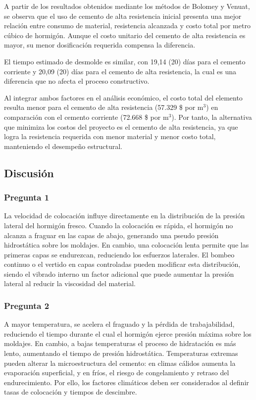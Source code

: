 A partir de los resultados obtenidos mediante los métodos de Bolomey y Venuat, se observa que el uso de cemento de alta resistencia inicial presenta una mejor relación entre consumo de material, resistencia alcanzada y costo total por metro cúbico de hormigón.  
Aunque el costo unitario del cemento de alta resistencia es mayor, su menor dosificación requerida compensa la diferencia.  

El tiempo estimado de desmolde es similar, con 19,14 (20) días para el cemento corriente y 20,09 (20) días para el cemento de alta resistencia, la cual es una diferencia que no afecta el proceso constructivo.  

Al integrar ambos factores en el análisis económico, el costo total del elemento resulta menor para el cemento de alta resistencia (57.329 \$ por m$^3$) en comparación con el cemento corriente (72.668 \$ por m$^3$).  
Por tanto, la alternativa que minimiza los costos del proyecto es el cemento de alta resistencia, ya que logra la resistencia requerida con menor material y menor costo total, manteniendo el desempeño estructural.

\subsection*{Discusión}

\subsubsection*{Pregunta 1} 
La velocidad de colocación influye directamente en la distribución de la presión lateral del hormigón fresco. Cuando la colocación es rápida, el hormigón no alcanza a fraguar en las capas de abajo, generando una pseudo presión hidrostática sobre los moldajes. En cambio, una colocación lenta permite que las primeras capas se endurezcan, reduciendo los esfuerzos laterales. El bombeo continuo o el vertido en capas controladas pueden modificar esta distribución, siendo el vibrado interno un factor adicional que puede aumentar la presión lateral al reducir la viscosidad del material.

\subsubsection*{Pregunta 2} 
A mayor temperatura, se acelera el fraguado y la pérdida de trabajabilidad, reduciendo el tiempo durante el cual el hormigón ejerce presión máxima sobre los moldajes. En cambio, a bajas temperaturas el proceso de hidratación es más lento, aumentando el tiempo de presión hidrostática. Temperaturas extremas pueden alterar la microestructura del cemento: en climas cálidos aumenta la evaporación superficial, y en fríos, el riesgo de congelamiento y retraso del endurecimiento. Por ello, los factores climáticos deben ser considerados al definir tasas de colocación y tiempos de descimbre.

